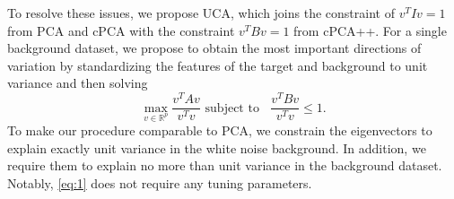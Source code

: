 \documentclass[12pt]{article}
\begin{document}
To resolve these issues, we propose UCA, which joins the constraint of $v^T I v = 1$ from PCA and cPCA with the constraint $v^T Bv = 1$ from cPCA++. For a single background dataset, we propose to obtain the most important directions of variation by standardizing the features of the target and background to unit variance and then solving
\begin{equation}
  \label{eq:1}
  \max_{v\in \mathbb{R}^p}{\frac{v^TAv}{v^T v}} \text{ subject to }\;\; \frac{v^TBv}{v^T v} \leq 1.
\end{equation}
To make our procedure comparable to PCA, we constrain the eigenvectors to explain exactly unit variance in the white noise background. In addition, we require them to explain no more than unit variance in the background dataset. Notably, \eqref{eq:1} does not require any tuning parameters.

\end{document}
